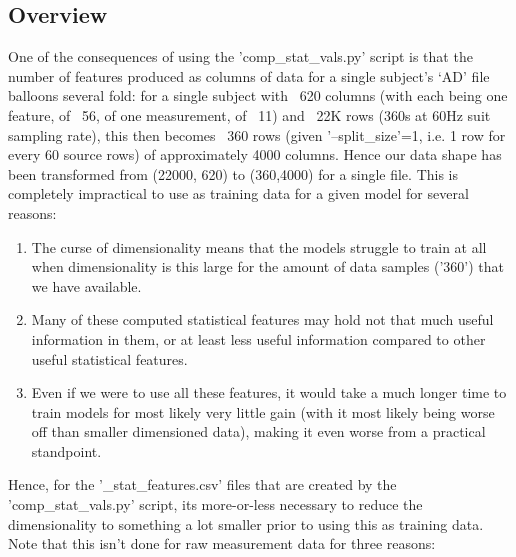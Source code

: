 \documentclass[12pt,twoside]{report}
\begin{document}
\subsection{Overview}

\quad One of the consequences of using the 'comp\_stat\_vals.py' script is that the number of features produced as columns of data for a single subject's ‘AD’ file balloons several fold: for a single subject with ~620 columns (with each being one feature, of ~56,  of one measurement, of ~11) and ~22K rows (360s at 60Hz suit sampling rate), this then becomes ~360 rows (given '--split\_size'=1, i.e. 1 row for every 60 source rows) of approximately 4000 columns. Hence our data shape has been transformed from (22000, 620) to (360,4000) for a single file. This is completely impractical to use as training data for a given model for several reasons:

\begin{enumerate}
	\item The curse of dimensionality means that the models struggle to train at all when dimensionality is this large for the amount of data samples ('360') that we have available.
	\item Many of these computed statistical features may hold not that much useful information in them, or at least less useful information compared to other useful statistical features.
	\item Even if we were to use all these features, it would take a much longer time to train models for most likely very little gain (with it most likely being worse off than smaller dimensioned data), making it even worse from a practical standpoint.
\end{enumerate}

\quad Hence, for the '\_stat\_features.csv' files that are created by the 'comp\_stat\_vals.py' script, its more-or-less necessary to reduce the dimensionality to something a lot smaller prior to using this as training data. Note that this isn't done for raw measurement data for three reasons:
\end{document}
